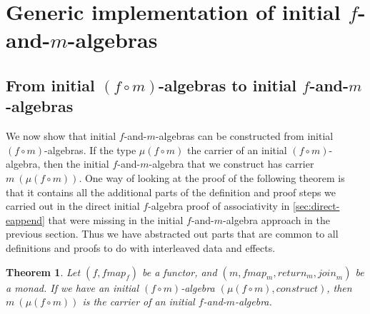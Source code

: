 \documentclass{jfp1}
\newtheorem{theorem}{Theorem}
\begin{document}

\section{Generic implementation of initial $f$-and-$m$-algebras}
\label{sec:impl-f-and-m}

\subsection{From initial $(f \circ m)$-algebras to initial $f$-and-$m$-algebras}

We now show that initial $f$-and-$m$-algebras can be constructed from
initial $(f \circ m)$-algebras. If the type $\mu(f \circ m)$ the
carrier of an initial $(f \circ m)$-algebra, then the initial
$f$-and-$m$-algebra that we construct has carrier $m~(\mu (f \circ
m))$. One way of looking at the proof of the following theorem is that
it contains all the additional parts of the definition and proof steps
we carried out in the direct initial $f$-algebra proof of
associativity in \autoref{sec:direct-eappend} that were missing in the
initial $f$-and-$m$-algebra approach in the previous section. Thus we
have abstracted out parts that are common to all definitions and
proofs to do with interleaved data and effects.

\begin{theorem}\label{thm:make-initial-f-and-m-alg}
  Let $(f, \mathit{fmap}_f)$ be a functor, and $(m, \mathit{fmap}_m,
  \mathit{return}_m, \mathit{join}_m)$ be a monad.  If we have an
  initial $(f \circ m)$-algebra $(\mu(f \circ m),
  \mathit{construct})$, then $m~(\mu(f \circ m))$ is the carrier of an
  initial $f$-and-$m$-algebra.
\end{theorem}
\end{document}
